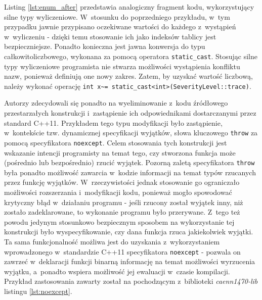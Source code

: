 

Listing \ref{lst:enum_after} przedstawia analogiczny fragment kodu, wykorzystujący silne typy wyliczeniowe. W~stosunku do poprzedniego przykładu, w~tym przypadku jawnie przypisano oczekiwane wartości do każdego z~wystąpień w~wyliczeniu - dzięki temu stosowanie ich jako indeksów tablicy jest bezpieczniejsze. Ponadto konieczna jest jawna konwersja do typu całkowitoliczbowego, wykonana za pomocą operatora \lstinline{static_cast}. Stosując silne typy wyliczeniowe programista nie stwarza możliwości wystąpienia konfliktu nazw, ponieważ definiują one nowy zakres. Zatem, by uzyskać wartość liczbową, należy wykonać operację \lstinline{int x~= static_cast<int>(SeverityLevel::trace)}.



Autorzy zdecydowali się ponadto na wyeliminowanie z~kodu źródłowego przestarzałych konstrukcji i~zastąpienie ich odpowiednikami dostarczanymi przez standard C++11. Przykładem tego typu 
modyfikacji było zastąpienie, w~kontekście tzw. dynamicznej specyfikacji wyjątków, słowa kluczowego \lstinline{throw} za pomocą specyfikatora \lstinline{noexcept}. Celem stosowania tych konstrukcji jest wskazanie intencji programisty na temat tego, czy stworzona funkcja może (pośrednio lub bezpośrednio) rzucić wyjątek. Pozorną zaletą specyfikatora \lstinline{throw} była ponadto możliwość zawarcia w~kodzie informacji na temat typów rzucanych przez funkcję wyjątków. W~rzeczywistości jednak stosowanie go ograniczało możliwości rozszerzania i~modyfikacji kodu, ponieważ mogło spowodować krytyczny błąd w~działaniu programu - jeśli rzucony został wyjątek inny, niż zostało zadeklarowane, to wykonanie programu było przerywane. Z~tego też powodu jedynym stosunkowo bezpiecznym sposobem na wykorzystanie tej konstrukcji było wyspecyfikowanie, czy dana funkcja rzuca jakiekolwiek wyjątki. Ta sama funkcjonalność możliwa jest do uzyskania z~wykorzystaniem wprowadzonego w~standardzie C++11 specyfikatora \lstinline{noexcept} - pozwala on zawrzeć w~deklaracji funkcji binarną informację na temat możliwości wyrzucenia wyjątku, a~ponadto wspiera możliwość jej ewaluacji w~czasie kompilacji. Przykład zastosowania zawarty został na pochodzącym z~biblioteki \emph{caenn1470-lib} listingu \ref{lst:noexcept}. 

